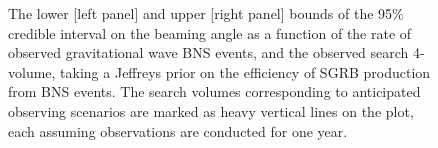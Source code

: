 \documentclass{kentigern}
\theoremstyle{definition}
\begin{document}
\begin{figure}[b]
  \checkoddpage
   
  \caption{
    The lower [left panel] and upper [right panel] bounds of
    the 95\% credible interval on the beaming angle as a function of
    the rate of observed gravitational wave BNS events, and the
    observed search 4-volume, taking a Jeffreys prior on the
    efficiency of SGRB production from BNS events. The search volumes
    corresponding to anticipated observing scenarios are marked as
    heavy vertical lines on the plot, each assuming observations are
    conducted for one year.
    \label{fig:beaming-jeffreys}
    }
\end{figure}
\end{document}
